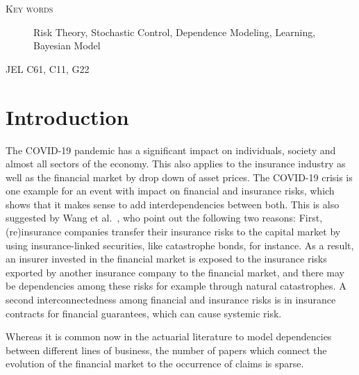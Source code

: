 \documentclass[reqno, 11pt]{amsart}%
\theoremstyle{definition}
\numberwithin{equation}{section} \numberwithin{theorem}{section}
\begin{document}

\vspace{0.5cm}
\begin{minipage}{14cm}
{\small
\begin{description}
\item[\rm \textsc{ Key words} ]
{\small Risk Theory, Stochastic Control, Dependence Modeling, Learning, Bayesian Model}
\item[\rm \textsc{JEL C61, C11, G22}]
\end{description}
}
\end{minipage}


\section{Introduction}

The COVID-19 pandemic has a significant impact on individuals, society and almost all sectors of the economy. This also applies to the insurance industry as well as the financial market by drop down of asset prices. The COVID-19 crisis is one example for an event with impact on financial and insurance risks, which shows that it makes sense to add interdependencies between both. This is also suggested by Wang et al.\ \cite{Wang2018}, who point out the following two reasons: First, (re)insurance companies transfer their insurance risks to the capital market by using insurance-linked securities, like catastrophe bonds, for instance. As a result, an insurer invested in the financial market is exposed to the insurance risks exported by another insurance company to the financial market, and there may be dependencies among these risks for example through natural catastrophes.
A second interconnectedness among financial and insurance risks is in insurance contracts for financial guarantees, which can cause systemic risk. 

Whereas  it is common now in the actuarial literature to model dependencies between different lines of business, the number of papers which connect the evolution of the financial market to the occurrence of claims is sparse. 
\end{document}
